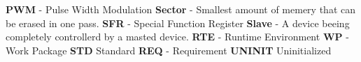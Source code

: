 \newline
{\bf PWM} - Pulse Width Modulation\newline
\newline
{\bf Sector} - Smallest amount of memery that can be erased in one pass.\newline
\newline
{\bf SFR} - Special Function Register\newline
\newline
{\bf Slave} - A device beeing completely controllerd by a masted device.\newline
\newline
{\bf RTE} - Runtime Environment\newline
\newline
{\bf WP} - Work Package\newline
\newline
{\bf STD} Standard\newline
\newline
{\bf REQ} - Requirement\newline
\newline
{\bf UNINIT} Uninitialized \newline
\newline


